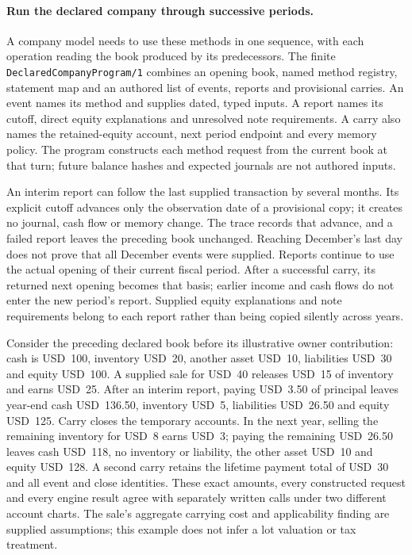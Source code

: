 \paragraph{Run the declared company through successive periods.}
A company model needs to use these methods in one sequence, with each operation
reading the book produced by its predecessors. The finite
\texttt{DeclaredCompanyProgram/1} combines an opening book, named method registry,
statement map and an authored list of events, reports and provisional carries.
An event names its method and supplies dated, typed inputs. A report names its
cutoff, direct equity explanations and unresolved note requirements. A carry also
names the retained-equity account, next period endpoint and every memory policy.
The program constructs each method request from the current book at that turn;
future balance hashes and expected journals are not authored inputs.

An interim report can follow the last supplied transaction by several months.
Its explicit cutoff advances only the observation date of a provisional copy;
it creates no journal, cash flow or memory change. The trace records that advance,
and a failed report leaves the preceding book unchanged. Reaching December's
last day does not prove that all December events were supplied. Reports continue
to use the actual opening of their current fiscal period. After a successful
carry, its returned next opening becomes that basis; earlier income and cash
flows do not enter the new period's report. Supplied equity explanations and note
requirements belong to each report rather than being copied silently across years.

Consider the preceding declared book before its illustrative owner contribution:
cash is USD~100, inventory USD~20, another asset USD~10, liabilities USD~30 and
equity USD~100. A supplied sale for USD~40 releases USD~15 of inventory and earns
USD~25. After an interim report, paying USD~3.50 of principal leaves year-end cash
USD~136.50, inventory USD~5, liabilities USD~26.50 and equity USD~125. Carry closes
the temporary accounts. In the next year, selling the remaining inventory for
USD~8 earns USD~3; paying the remaining USD~26.50 leaves cash USD~118, no inventory
or liability, the other asset USD~10 and equity USD~128. A second carry retains the
lifetime payment total of USD~30 and all event and close identities. These exact
amounts, every constructed request and every engine result agree with separately
written calls under two different account charts. The sale's aggregate carrying
cost and applicability finding are supplied assumptions; this example does not
infer a lot valuation or tax treatment.

